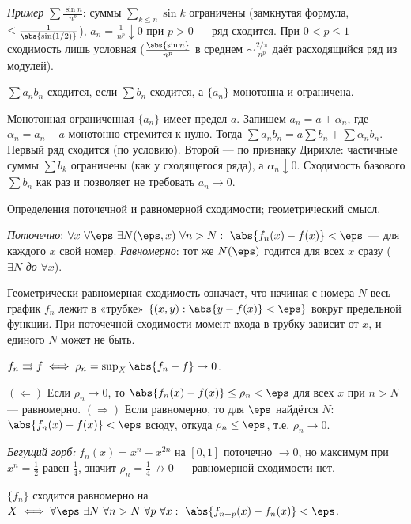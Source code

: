 \emph{Пример} $\sum\tfrac{\sin n}{n^p}$:
суммы $\sum_{k\le n}\sin k$ ограничены (замкнутая формула, $\le\tfrac1{\abs{\sin(1/2)}}$),
$a_n=\tfrac1{n^p}\downarrow0$ при $p>0$ — ряд сходится. При $0<p\le1$ сходимость лишь условная
($\tfrac{\abs{\sin n}}{n^p}$ в среднем $\sim\tfrac{2/\pi}{n^p}$ даёт расходящийся ряд из модулей).

\stmt $\sum a_n b_n$ сходится, если $\sum b_n$ сходится, а $\{a_n\}$ монотонна и ограничена.

\dok Монотонная ограниченная $\{a_n\}$ имеет предел $a$. Запишем $a_n=a+\alpha_n$, где
$\alpha_n=a_n-a$ монотонно стремится к нулю. Тогда $\sum a_n b_n=a\sum b_n+\sum\alpha_n b_n$. Первый
ряд сходится (по условию). Второй — по признаку Дирихле: частичные суммы $\sum b_k$ ограничены (как
у сходящегося ряда), а $\alpha_n\downarrow0$. Сходимость базового $\sum b_n$ как раз и позволяет не
требовать $a_n\to0$.

\stmt Определения поточечной и равномерной сходимости; геометрический смысл.

\dok \emph{Поточечно}: $\forall x\ \forall\eps\ \exists N(\eps,x)\ \forall n>N:\
\abs{f_n(x)-f(x)}<\eps$ — для каждого $x$ свой номер. \emph{Равномерно}: тот же $N(\eps)$ годится
для всех $x$ сразу ($\exists N$ \emph{до} $\forall x$).

Геометрически равномерная сходимость
означает, что начиная с номера $N$ весь график $f_n$ лежит в «трубке»
$\{(x,y):\abs{y-f(x)}<\eps\}$ вокруг предельной функции. При поточечной сходимости момент входа в
трубку зависит от $x$, и единого $N$ может не быть.

\stmt $f_n\rightrightarrows f\iff\rho_n=\sup_X\abs{f_n-f}\to0$.

\dok $(\Leftarrow)$ Если $\rho_n\to0$, то $\abs{f_n(x)-f(x)}\le\rho_n<\eps$ для всех $x$ при $n>N$ —
равномерно. $(\Rightarrow)$ Если равномерно, то для $\eps$ найдётся $N$: $\abs{f_n(x)-f(x)}<\eps$
всюду, откуда $\rho_n\le\eps$, т.е. $\rho_n\to0$.

\emph{Бегущий горб:} $f_n(x)=x^n-x^{2n}$ на
$[0,1]$ поточечно $\to0$, но максимум при $x^n=\tfrac12$ равен $\tfrac14$, значит
$\rho_n=\tfrac14\not\to0$ — равномерной сходимости нет.

\stmt $\{f_n\}$ сходится равномерно на $X\iff\forall\eps\ \exists N\ \forall n>N\ \forall p\
\forall x:\ \abs{f_{n+p}(x)-f_n(x)}<\eps$.

